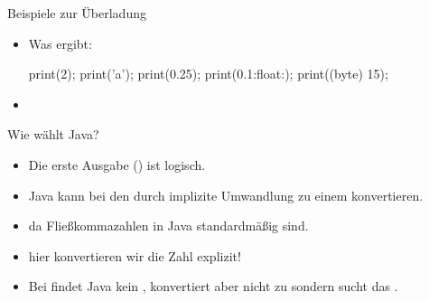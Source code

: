 \begin{frame}[t,fragile]{Beispiele zur Überladung}
    \begin{itemize}[<+(1)->]
        \item Was ergibt:\pause{}
\begin{java*}
print(2); print('a'); print(0.25); print(0.1:float:);
print((byte) 15);
\end{java*}
        \item {}
    \end{itemize}
\end{frame}

\begin{frame}[t,fragile]{Wie wählt Java?}
    \begin{itemize}[<+(1)->]
        \item Die erste Ausgabe () ist logisch.\pause{} 
        \item Java kann bei  den \pause{} durch implizite Umwandlung zu einem  konvertieren.
        \item {}\pause{} da Fließkommazahlen in Java standardmäßig  sind.
        \item {}\pause{} hier
            konvertieren wir die Zahl explizit!
        \item Bei \pause{}
             findet Java kein ,\pause{} konvertiert aber nicht zu
              sondern sucht das  .
    \end{itemize}
\end{frame}

